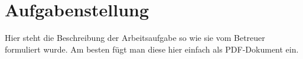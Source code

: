 

\section*{Aufgabenstellung}
Hier steht die Beschreibung der Arbeitsaufgabe so wie sie vom Betreuer formuliert wurde. Am besten fügt man diese hier einfach als PDF-Dokument ein.

%
